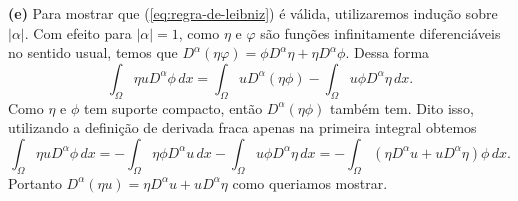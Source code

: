\documentclass[a4paper, 11pt]{book}
\theoremstyle{definition}
\begin{document}
\begin{prf}
    \textbf{(e)} Para mostrar que (\ref{eq:regra-de-leibniz}) é válida, utilizaremos indução sobre $|\alpha|$. Com efeito para $|\alpha|= 1$, como $\eta$ e $\varphi$ são funções infinitamente diferenciáveis no sentido usual, temos que $D^{\alpha} (\eta \varphi) = \phi D^{\alpha}\eta + \eta D^{\alpha} \phi$.
    Dessa forma
    \[
        \int_\Omega \eta u D^{\alpha} \phi \, dx = \int_\Omega u D^{\alpha} (\eta \phi) - \int_\Omega u\phi D^{\alpha} \eta \, dx.
    \]
    Como $\eta$ e $\phi$ tem suporte compacto, então $D^{\alpha}(\eta \phi)$ também tem. 
    Dito isso, utilizando a definição de derivada fraca apenas na primeira integral obtemos
    \[
        \int_\Omega \eta u D^{\alpha} \phi \, dx = -\int_\Omega \eta \phi D^{\alpha} u \, dx - \int_\Omega u\phi D^{\alpha} \eta \, dx = -\int_\Omega (\eta D^{\alpha}u + uD^{\alpha}\eta) \phi \,dx.
    \]
    Portanto $D^{\alpha}(\eta u) = \eta D^{\alpha}u + uD^{\alpha}\eta$ como queriamos mostrar.


\end{prf}
\end{document}
